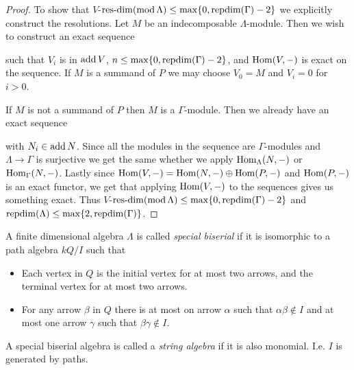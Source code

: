 \begin{theorem}
\begin{proof}
		To show that $V$-$\operatorname{res-dim}(\operatorname{mod} \Lambda) \leq \max\{0, \operatorname{repdim}(\Gamma)-2\}$ we explicitly construct the resolutions. Let $M$ be an indecomposable $\Lambda$-module. Then we wish to construct an exact sequence
		\begin{center}
		\end{center} 
		such that $V_i$ is in $\operatorname{add} V$, $n\leq \max\{0, \operatorname{repdim}(\Gamma)-2\}$, and $\operatorname{Hom}(V, -)$ is exact on the sequence. If $M$ is a summand of $P$ we may choose $V_0=M$ and $V_i=0$ for $i>0$.
		
		If $M$ is not a summand of $P$ then $M$ is a $\Gamma$-module. Then we already have an exact sequence
		\begin{center}
		\end{center} 
		with $N_i \in \operatorname{add} N$. Since all the modules in the sequence are $\Gamma$-modules and $\Lambda \to \Gamma$ is surjective we get the same whether we apply $\operatorname{Hom}_\Lambda(N, -)$ or $\operatorname{Hom}_\Gamma(N,-)$. Lastly since $\operatorname{Hom}(V,-) = \operatorname{Hom}(N, -) \oplus \operatorname{Hom}(P, -)$ and $\operatorname{Hom}(P, -)$ is an exact functor, we get that applying $\operatorname{Hom}(V, -)$ to the sequences gives us something exact. Thus $V$-$\operatorname{res-dim}(\operatorname{mod} \Lambda) \leq \max\{0, \operatorname{repdim}(\Gamma)-2\}$ and $\operatorname{repdim}(\Lambda) \leq \max\{2, \operatorname{repdim}(\Gamma)\}$. 
	\end{proof}
\end{theorem}

\begin{defn}
	A finite dimensional algebra $\Lambda$ is called \emph{special biserial} if it is isomorphic to a path algebra $kQ/I$ such that
	\begin{itemize}
		\item Each vertex in $Q$ is the initial vertex for at most two arrows, and the terminal vertex for at most two arrows.
		\item For any arrow $\beta$ in $Q$ there is at most on arrow $\alpha$ such that $\alpha\beta \not\in I$ and at most one arrow $\gamma$ such that $\beta\gamma \not\in I$.
	\end{itemize}
	A special biserial algebra is called a \emph{string algebra} if it is also monomial. I.e. $I$ is generated by paths. 
\end{defn}

